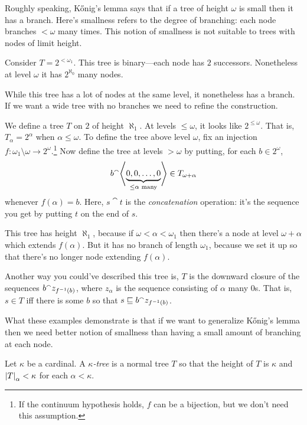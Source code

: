 \documentclass[10pt]{amsart}
\begin{document}
Roughly speaking, K\H{o}nig's lemma says that if a tree of height $\omega$ is small then it has a branch. Here's smallness refers to the degree of branching: each node branches $<\omega$ many times. This notion of smallness is not suitable to trees with nodes of limit height.

\begin{example}
Consider $T = 2^{<\omega_1}$. This tree is binary---each node has $2$ successors. Nonetheless at level $\omega$ it has $2^{\aleph_0}$ many nodes.
\end{example}

While this tree has a lot of nodes at the same level, it nonetheless has a branch. If we want a wide tree with no branches we need to refine the construction.

\begin{example}
We define a tree $T$ on $2$ of height $\aleph_1$. At levels $\le\omega$, it looks like $2^{\le\omega}$. That is, $T_\alpha = 2^\alpha$ when $\alpha \le \omega$. To define the tree above level $\omega$, fix an injection $f : \omega_1 \setminus \omega \to 2^\omega$.\footnote{If the continuum hypothesis holds, $f$ can be a bijection, but we don't need this assumption.} Now define the tree at levels $>\omega$ by putting, for each $b \in 2^\omega$,
\[
b {}^\smallfrown {\left\langle \underbrace{0,0,\ldots,0}_{\le\alpha \text{ many}} \right\rangle} \in T_{\omega+\alpha}
\]
whenever $f(\alpha) = b$. Here, $s \cat t$ is the \emph{concatenation} operation: it's the sequence you get by putting $t$ on the end of $s$.

This tree has height $\aleph_1$, because if $\omega < \alpha < \omega_1$ then there's a node at level $\omega + \alpha$ which extends $f(\alpha)$. But it has no branch of length $\omega_1$, because we set it up so that there's no longer node extending $f(\alpha)$. 
\end{example}

Another way you could've described this tree is, $T$ is the downward closure of the sequences $b {}^\smallfrown z_{f^{-1}(b)}$, where $z_\alpha$ is the sequence consisting of $\alpha$ many $0$s. That is, $s \in T$ iff there is some $b$ so that $s \sqsubseteq b {}^\smallfrown z_{f^{-1}(b)}$.

\smallskip

What these examples demonstrate is that if we want to generalize K\H{o}nig's lemma then we need better notion of smallness than having a small amount of branching at each node.

\begin{definition}
Let $\kappa$ be a cardinal. A \emph{$\kappa$-tree} is a normal tree $T$ so that the height of $T$ is $\kappa$ and $\left\lvert T \right\rvert_\alpha < \kappa$ for each $\alpha < \kappa$.
\end{definition}
\end{document}
